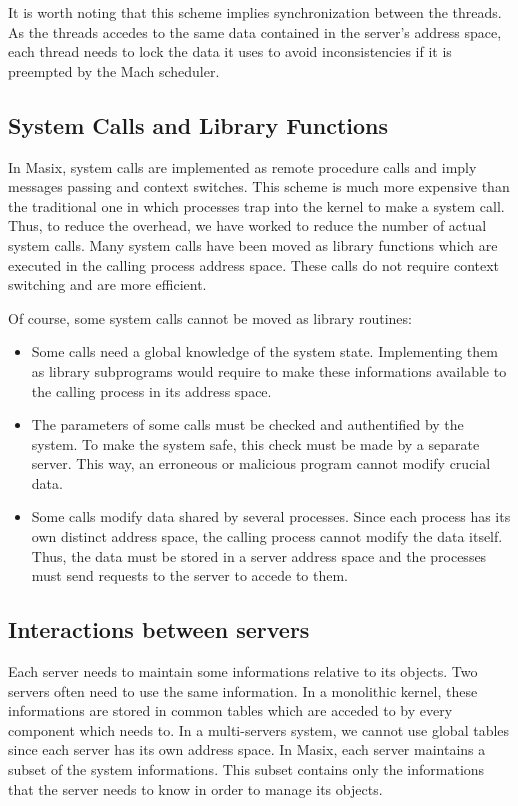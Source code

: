 	It is worth noting that this scheme implies synchronization between
the threads. As the threads accedes to the same data contained in the server's
address space, each thread needs to lock the data it uses to avoid
inconsistencies if it is preempted by the Mach scheduler.

\subsection {System Calls and Library Functions}

	In Masix, system calls are implemented as remote procedure calls and
imply messages passing and context switches. This scheme is much more expensive
than the traditional one in which processes trap into the kernel to make a
system call. Thus, to reduce the overhead, we have worked to reduce the number
of actual system calls. Many system calls have been moved as library functions
which are executed in the calling process address space. These calls do not
require context switching and are more efficient.

	Of course, some system calls cannot be moved as library routines:
\begin {itemize}
\item Some calls need a global knowledge of the system state. Implementing
them as library subprograms would require to make these informations available
to the calling process in its address space.
\item The parameters of some calls must be checked and authentified by the
system. To make the system safe, this check must be made by a separate
server. This way, an erroneous or malicious program cannot modify crucial
data.
\item Some calls modify data shared by several processes. Since each process
has its own distinct address space, the calling process cannot modify the
data itself. Thus, the data must be stored in a server address space and the
processes must send requests to the server to accede to them.
\end {itemize}

\subsection {Interactions between servers}

	Each server needs to maintain some informations relative to its
objects. Two servers often need to use the same information. In a monolithic
kernel, these informations are stored in common tables which are acceded to by
every component which needs to. In a multi-servers system, we cannot use global
tables since each server has its own address space. In Masix, each server
maintains a subset of the system informations. This subset contains only the
informations that the server needs to know in order to manage its objects.

